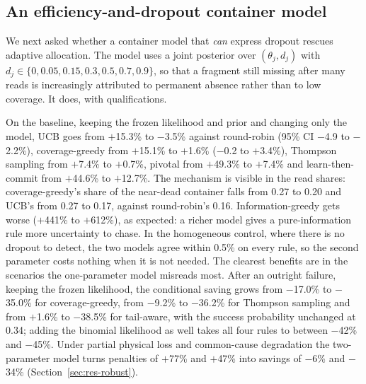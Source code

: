 \documentclass[conference,onecolumn,11pt]{IEEEtran}
\begin{document}
\subsection{An efficiency-and-dropout container model}\label{sec:res-dropout}

We next asked whether a container model that \emph{can} express dropout rescues adaptive allocation.
The model uses a joint posterior over $(\theta_j,d_j)$ with $d_j\in\{0,0.05,0.15,0.3,0.5,0.7,0.9\}$, so
that a fragment still missing after many reads is increasingly attributed to permanent absence rather
than to low coverage.  It does, with qualifications.

On the baseline, keeping the frozen likelihood and prior and changing only the model, UCB goes from
$+$15.3\% to $-$3.5\% against round-robin (95\% CI $-$4.9 to $-$2.2\%), coverage-greedy from $+$15.1\%
to $+$1.6\% ($-$0.2 to $+$3.4\%), Thompson sampling from $+$7.4\% to $+$0.7\%, pivotal from $+$49.3\%
to $+$7.4\% and learn-then-commit from $+$44.6\% to $+$12.7\%.  The mechanism is visible in the read
shares: coverage-greedy's share of the near-dead container falls from 0.27 to 0.20 and UCB's from 0.27
to 0.17, against round-robin's 0.16.  Information-greedy gets worse ($+$441\% to $+$612\%), as expected:
a richer model gives a pure-information rule more uncertainty to chase.  In the homogeneous control,
where there is no dropout to detect, the two models agree within 0.5\% on every rule, so the second
parameter costs nothing when it is not needed.  The clearest benefits are in the scenarios the
one-parameter model misreads most.  After an outright failure, keeping the frozen likelihood, the conditional saving grows
from $-$17.0\% to $-$35.0\% for coverage-greedy, from $-$9.2\% to $-$36.2\% for Thompson sampling and
from $+$1.6\% to $-$38.5\% for tail-aware, with the success probability unchanged at 0.34; adding the
binomial likelihood as well takes all four rules to between $-$42\% and $-$45\%.  Under partial physical
loss and common-cause degradation the two-parameter model turns penalties of $+$77\% and $+$47\% into
savings of $-$6\% and $-$34\% (Section~\ref{sec:res-robust}).
\end{document}
